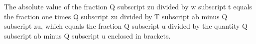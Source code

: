 The absolute value of the fraction Q subscript zu divided by w subscript t equals the fraction one times Q subscript zu divided by T subscript ab minus Q subscript zu, which equals the fraction Q subscript u divided by the quantity Q subscript ab minus Q subscript u enclosed in brackets.